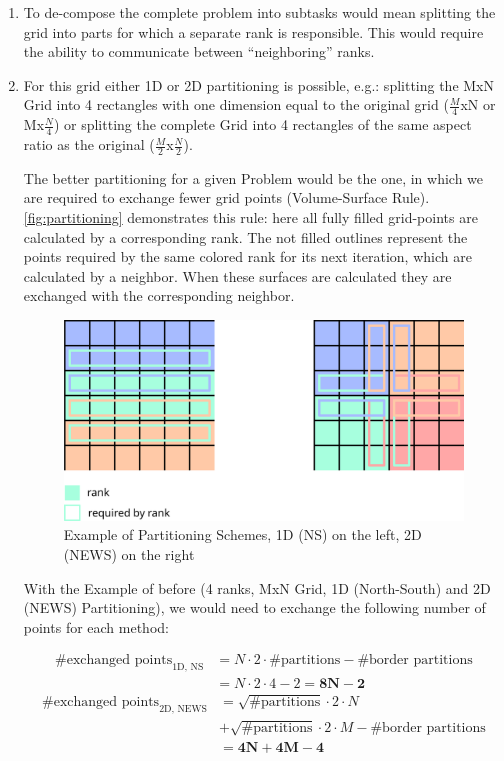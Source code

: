 \documentclass[]{scrartcl}
\begin{document}
\begin{enumerate}
    \item To de-compose the complete problem into subtasks would mean splitting the grid into parts for which a separate rank is responsible.
        This would require the ability to communicate between ``neighboring'' ranks.
    \item For this grid either 1D or 2D partitioning is possible, e.g.: splitting the MxN Grid into 4 rectangles with one dimension equal to the original grid ($\frac M4$xN or Mx$\frac N4$) or splitting the complete Grid into 4 rectangles of the same aspect ratio as the original ($\frac M2$x$\frac N2$).

    The better partitioning for a given Problem would be the one, in which we are required to exchange fewer grid points (Volume-Surface Rule).
    \autoref{fig:partitioning} demonstrates this rule: here all fully filled grid-points are calculated by a corresponding rank.
    The not filled outlines represent the points required by the same colored rank for its next iteration, which are calculated by a neighbor.
    When these surfaces are calculated they are exchanged with the corresponding neighbor.

    \begin{figure}[H]
        \centering
        \includegraphics[width=0.8\linewidth]{img/partitioning.png}
        \caption{Example of Partitioning Schemes, 1D (NS) on the left, 2D (NEWS) on the right}%
        \label{fig:partitioning}
    \end{figure}

    With the Example of before (4 ranks, MxN Grid, 1D (North-South) and 2D (NEWS) Partitioning), we would need to exchange the following number of points for each method:

    \begin{align}
        \text{\# exchanged points}_\text{1D, NS} &= N \cdot 2 \cdot \text{\# partitions} - \text{\# border partitions}\\
                                                    &= N\cdot 2 \cdot 4 - 2 = \mathbf{8N-2}
    \end{align}
    \begin{align}
        \text{\# exchanged points}_\text{2D, NEWS} &= \sqrt{\text{\# partitions}} \cdot 2 \cdot N \nonumber\\
                                                      &+ \sqrt{\text{\# partitions}} \cdot 2 \cdot M - \text{\# border partitions}\\
                                                      &= \mathbf{4N + 4M - 4}
    \end{align}


\end{enumerate}
\end{document}
